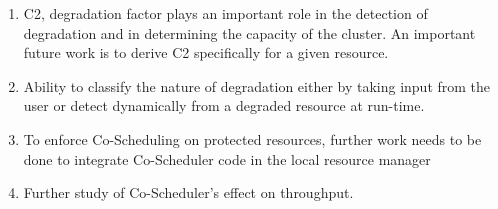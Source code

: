 \documentclass[ms,electronic,double]{nuthesis}
\begin{document}
\begin{enumerate}
  \item{C2, degradation factor plays an important role in the detection of degradation and in determining the capacity of the cluster. An important future
  work is to derive C2 specifically for a given resource.}
  \item{Ability to classify the nature of degradation either by taking input from the user or detect dynamically from a degraded resource at run-time.}
  \item{To enforce Co-Scheduling on protected resources, further work needs to be done to integrate Co-Scheduler code  in the local resource manager}
  \item{Further study of Co-Scheduler's effect on throughput.}
\end{enumerate}

\backmatter

\appendix




\nocite{*}

\end{document}
